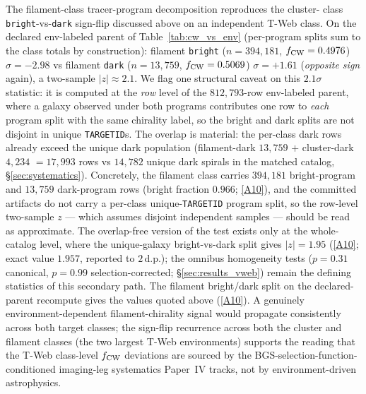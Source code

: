 \documentclass[twocolumn,linenumbers]{aastex702}
\newcommand{\repoBase}{https://github.com/Hubify-Projects/bigbounce/blob/main}
\begin{document}
The filament-class tracer-program decomposition reproduces the cluster-
class \texttt{bright}-vs-\texttt{dark} sign-flip discussed above on an
independent T-Web class. On the declared env-labeled parent of
Table~\ref{tab:cw_vs_env} (per-program splits sum to the class totals
by construction): filament \texttt{bright} ($n = 394{,}181$,
$f_{\rm CW} = 0.4976$) $\sigma = -2.98$ vs filament \texttt{dark}
($n = 13{,}759$, $f_{\rm CW} = 0.5069$)
$\sigma = +1.61$ (\emph{opposite sign} again), a two-sample
$|z| \approx 2.1$. We flag one structural caveat on this $2.1\sigma$
statistic: it is computed at the \emph{row} level of the
$812{,}793$-row env-labeled parent, where a galaxy observed under
both programs contributes one row to \emph{each} program split with
the same chirality label, so the bright and dark splits are not
disjoint in unique \texttt{TARGETID}s. The overlap is material: the
per-class dark rows already exceed the unique dark population
(filament-dark $13{,}759$ $+$ cluster-dark $4{,}234$ $= 17{,}993$
rows vs $14{,}782$ unique dark spirals in the matched catalog,
\S\ref{sec:systematics}). Concretely, the filament class carries
$394{,}181$ bright-program and $13{,}759$ dark-program rows
(bright fraction $0.966$;
\href{\repoBase/pipelines/p5\_desi\_chirality/outputs/17\_v0151\_closure\_recomputes.json}{[A10]}),
and the committed artifacts do not carry a
per-class unique-\texttt{TARGETID} program split, so the row-level
two-sample $z$ — which assumes disjoint independent samples — should
be read as approximate. The overlap-free version of the test exists
only at the whole-catalog level, where the unique-galaxy
bright-vs-dark split gives $|z| = 1.95$
(\href{\repoBase/pipelines/p5\_desi\_chirality/outputs/17\_v0151\_closure\_recomputes.json}{[A10]};
exact value $1.957$, reported to $2$\,d.p.);
the omnibus homogeneity tests
($p = 0.31$ canonical, $p = 0.99$ selection-corrected;
\S\ref{sec:results_vweb}) remain the defining statistics of this
secondary path. The filament bright/dark split on the declared-parent recompute
gives the values quoted above
(\href{\repoBase/pipelines/p5\_desi\_chirality/outputs/17\_v0151\_closure\_recomputes.json}{[A10]}).
A genuinely environment-dependent
filament-chirality signal would propagate consistently across both
target classes; the sign-flip recurrence across both the cluster and
filament classes (the two largest T-Web environments) supports the
reading that the T-Web class-level $f_{\rm CW}$ deviations are sourced
by the BGS-selection-function-conditioned imaging-leg systematics
Paper~IV tracks, not by environment-driven astrophysics.
\end{document}
